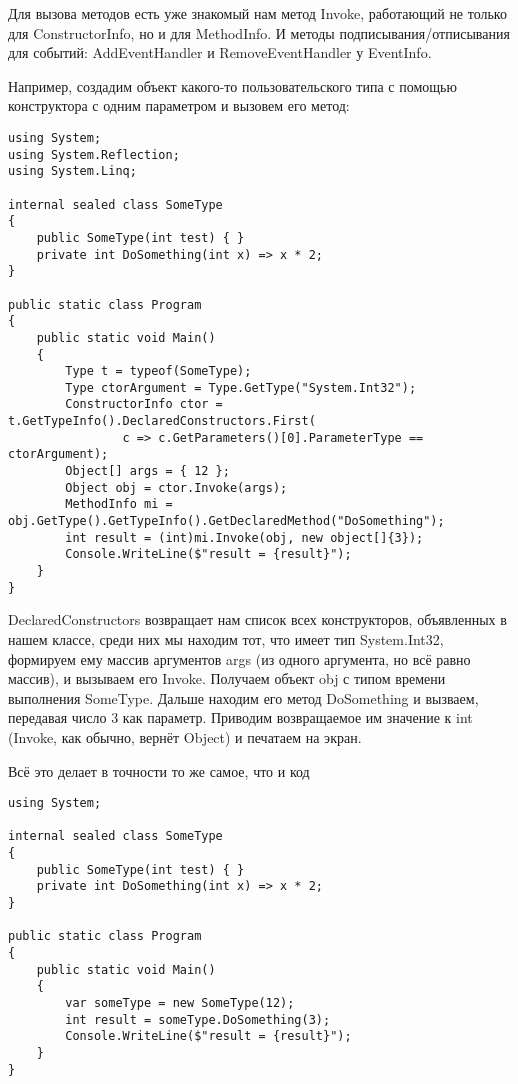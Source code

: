 \documentclass{../../text-style}
\begin{document}
Для вызова методов есть уже знакомый нам метод Invoke, работающий не только для ConstructorInfo, но и для MethodInfo. И методы подписывания/отписывания для событий: AddEventHandler и RemoveEventHandler у EventInfo.

Например, создадим объект какого-то пользовательского типа с помощью конструктора с одним параметром и вызовем его метод:

\begin{verbatim}
using System;
using System.Reflection;
using System.Linq;

internal sealed class SomeType 
{
    public SomeType(int test) { }
    private int DoSomething(int x) => x * 2;
}

public static class Program 
{
    public static void Main() 
    {
        Type t = typeof(SomeType);
        Type ctorArgument = Type.GetType("System.Int32");
        ConstructorInfo ctor = t.GetTypeInfo().DeclaredConstructors.First(
                c => c.GetParameters()[0].ParameterType == ctorArgument);
        Object[] args = { 12 };
        Object obj = ctor.Invoke(args);
        MethodInfo mi = obj.GetType().GetTypeInfo().GetDeclaredMethod("DoSomething");
        int result = (int)mi.Invoke(obj, new object[]{3});
        Console.WriteLine($"result = {result}");
    }
}
\end{verbatim}

DeclaredConstructors возвращает нам список всех конструкторов, объявленных в нашем классе, среди них мы находим тот, что имеет тип System.Int32, формируем ему массив аргументов args (из одного аргумента, но всё равно массив), и вызываем его Invoke. Получаем объект obj с типом времени выполнения SomeType. Дальше находим его метод DoSomething и вызваем, передавая число 3 как параметр. Приводим возвращаемое им значение к int (Invoke, как обычно, вернёт Object) и печатаем на экран.

Всё это делает в точности то же самое, что и код

\begin{verbatim}
using System;

internal sealed class SomeType 
{
    public SomeType(int test) { }
    private int DoSomething(int x) => x * 2;
}

public static class Program 
{
    public static void Main() 
    {
        var someType = new SomeType(12);
        int result = someType.DoSomething(3);
        Console.WriteLine($"result = {result}");
    }
}
\end{verbatim}
\end{document}
